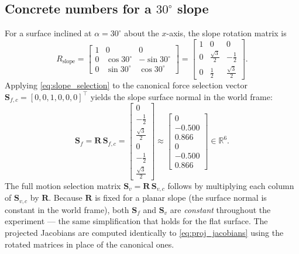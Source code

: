 \documentclass[
	german,%
	accentcolor=9c,%
	ruledheaders=section,%
	class=report,%
	thesis={type=bachelor},%
	fontsize=11pt,%
	parskip=half-,%
	custommargins=true,%
	marginpar=false,%
]{tudapub}
\begin{document}
\subsection*{Concrete numbers for a \(30^\circ\) slope}

For a surface inclined at $\alpha = 30^\circ$ about the $x$-axis,
the slope rotation matrix is
\begin{equation}
    R_\text{slope} =
    \begin{bmatrix}
        1 & 0 & 0 \\
        0 & \cos 30^\circ & -\sin 30^\circ \\
        0 & \sin 30^\circ &  \cos 30^\circ
    \end{bmatrix}
    =
    \begin{bmatrix}
        1 & 0 & 0 \\
        0 & \tfrac{\sqrt{3}}{2} & -\tfrac{1}{2} \\
        0 & \tfrac{1}{2} & \tfrac{\sqrt{3}}{2}
    \end{bmatrix}.
\end{equation}
Applying \eqref{eq:slope_selection} to the canonical force selection vector
$\mathbf{S}_{f,c} = [0,0,1,0,0,0]^\top$ yields the slope surface normal in
the world frame:
\begin{equation}
    \mathbf{S}_f =
    \mathbf{R}\,\mathbf{S}_{f,c}
    =
    \begin{bmatrix}
        0 \\ -\tfrac{1}{2} \\ \tfrac{\sqrt{3}}{2} \\ 0 \\ -\tfrac{1}{2} \\ \tfrac{\sqrt{3}}{2}
    \end{bmatrix}
    \approx
    \begin{bmatrix}
        0 \\ -0.500 \\ 0.866 \\ 0 \\ -0.500 \\ 0.866
    \end{bmatrix}
    \in \mathbb{R}^{6}.
\end{equation}
The full motion selection matrix $\mathbf{S}_v = \mathbf{R}\,\mathbf{S}_{v,c}$
follows by multiplying each column of $\mathbf{S}_{v,c}$ by $\mathbf{R}$.
Because $\mathbf{R}$ is fixed for a planar slope (the surface normal is
constant in the world frame), both $\mathbf{S}_f$ and $\mathbf{S}_v$ are
\emph{constant} throughout the experiment — the same simplification that
holds for the flat surface.
The projected Jacobians are computed identically to \eqref{eq:proj_jacobians}
using the rotated matrices in place of the canonical ones.
\end{document}
